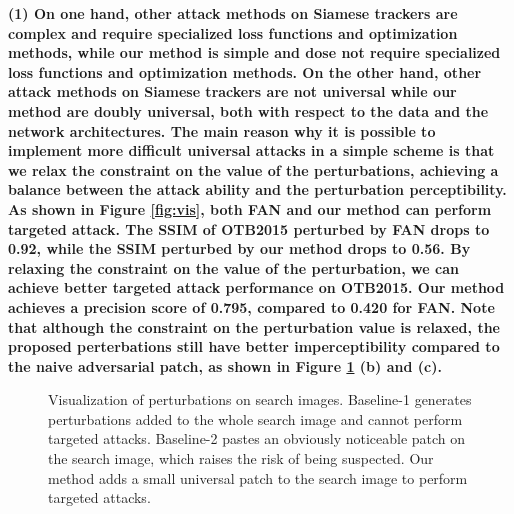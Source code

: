 \documentclass[12pt]{article}
\begin{document}
\textbf{
(1) On one hand, other attack methods on Siamese trackers are complex and require specialized loss functions and optimization methods, while our method is simple and dose not require specialized loss functions and optimization methods.
On the other hand, other attack methods on Siamese trackers are not universal while our method are doubly universal, both with respect to the data and the network architectures.
The main reason why it is possible to implement more difficult universal attacks in a simple scheme is that we relax the constraint on the value of the perturbations, achieving a balance between the attack ability and the perturbation perceptibility.
As shown in Figure \ref{fig:vis}, both FAN \cite{FAN} and our method can perform targeted attack. 
The SSIM of OTB2015 perturbed by FAN drops to 0.92, while the SSIM perturbed by our method drops to 0.56.
By relaxing the constraint on the value of the perturbation, we can achieve better targeted attack performance on OTB2015.
Our method achieves a precision score of 0.795, compared to 0.420 for FAN.
Note that although the constraint on the perturbation value is relaxed, the proposed perterbations still have better imperceptibility compared to the naive adversarial patch, as shown in Figure \ref{fig:imperceptible} (b) and (c).
}

\begin{figure}[t]
    \renewcommand\thefigure{5}
    \centering
    \caption{Visualization of perturbations on search images. Baseline-1 generates perturbations added to the whole search image and cannot perform targeted attacks. Baseline-2 pastes an obviously noticeable patch on the search image, which raises the risk of being suspected. Our method adds a small universal patch to the search image to perform targeted attacks.}
    \label{fig:imperceptible}
  \end{figure}
\end{document}
